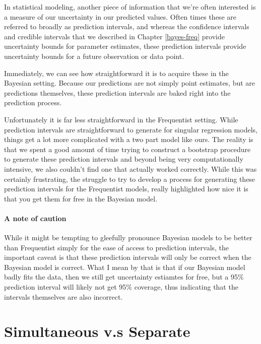 \documentclass[12pt,twoside]{reedthesis}
\begin{document}
In statistical modeling, another piece of information that we're often interested is a measure of our uncertainty in our predicted values. Often times these are referred to broadly as prediction intervals, and whereas the confidence intervals and credible intervals that we described in Chapter \ref{bayes-freq} provide uncertainty bounds for parameter estimates, these prediction intervals provide uncertainty bounds for a future observation or data point.

Immediately, we can see how straightforward it is to acquire these in the Bayesian setting. Because our predictions are not simply point estimates, but are predictions themselves, these prediction intervals are baked right into the prediction process.

Unfortunately it is far less straightforward in the Frequentist setting. While prediction intervals are straightforward to generate for singular regression models, things get a lot more complicated with a two part model like ours. The reality is that we spent a good amount of time trying to construct a bootstrap procedure to generate these prediction intervals and beyond being very computationally intensive, we also couldn't find one that actually worked correctly. While this was certainly frustrating, the struggle to try to develop a process for generating these prediction intervals for the Frequentist models, really highlighted how nice it is that you get them for free in the Bayesian model.

\hypertarget{a-note-of-caution}{%
\subsubsection{A note of caution}\label{a-note-of-caution}}

While it might be tempting to gleefully pronounce Bayesian models to be better than Frequentist simply for the ease of access to prediction intervals, the important caveat is that these prediction intervals will only be correct when the Bayesian model is correct. What I mean by that is that if our Bayesian model badly fits the data, then we still get uncertainty estiamtes for free, but a 95\% prediction interval will likely not get 95\% coverage, thus indicating that the intervals themselves are also incorrect.

\hypertarget{sepsim}{%
\chapter{Simultaneous v.s Separate}\label{sepsim}}
\end{document}
